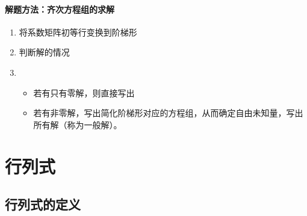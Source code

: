\documentclass[a4paper]{ctexbook}
\begin{document}
\subsection{解题方法：齐次方程组的求解}
\begin{enumerate}
    \item 将系数矩阵初等行变换到阶梯形
    \item 判断解的情况
    \item {\begin{itemize}
        \item 若有只有零解，则直接写出
        \item 若有非零解，写出简化阶梯形对应的方程组，从而确定自由未知量，写出所有解（称为一般解）。
        \end{itemize}}
\end{enumerate}

\part{行列式}
\chapter{行列式的定义}
\end{document}
